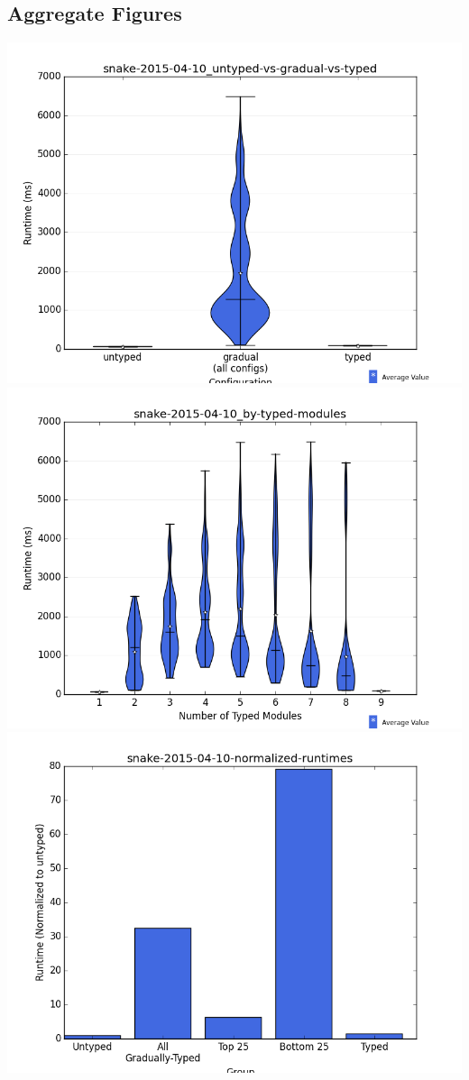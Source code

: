\documentclass{article}
\begin{document}
\subsection{Aggregate Figures}
\includegraphics[width=\textwidth]{snake-2015-04-10_untyped-vs-gradual-vs-typed-violin.png}
\includegraphics[width=\textwidth]{snake-2015-04-10_by-typed-modules-violin.png}
\includegraphics[width=\textwidth]{snake-2015-04-10-normalized-runtimes-bar.png}
\end{document}
